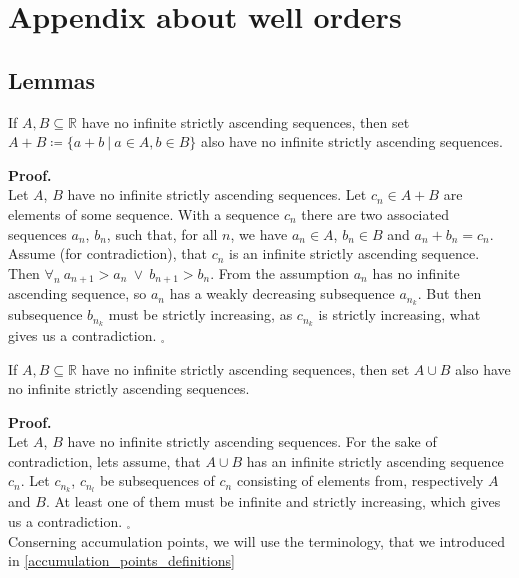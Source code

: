\chapter{Appendix about well orders}
\section{Lemmas}
\begin{lemma}\label{two_sets_lemma}
If $A, B \subseteq \mathbb{R}$ have no infinite strictly ascending sequences, then set 
$A + B \coloneqq \{a+b\ |\ a \in A, b \in B\}$ also have no infinite strictly ascending sequences. 
\end{lemma}
\noindent\textbf{Proof.} \\
Let $A$, $B$ have no infinite strictly ascending sequences. 
Let $c_n \in A + B$ are elements of some sequence. With a sequence $c_n$ there are 
two associated sequences $a_n$, $b_n$, such that, for all $n$, we have $a_n \in A$, 
$b_n \in B$ and 
$a_n + b_n = c_n$. Assume (for contradiction), that $c_n$ is an infinite strictly 
ascending sequence. 
Then $\forall_n\ a_{n+1}>a_n\ \lor\ b_{n+1} > b_n$. From the assumption $a_n$ has no infinite 
ascending sequence, so $a_n$ has a weakly decreasing subsequence $a_{n_k}$. But then 
subsequence $b_{n_k}$ must be strictly increasing, as $c_{n_k}$ is strictly increasing, what gives 
us a contradiction. 
$_\square$ 

\begin{lemma}\label{sum_lemma}
If $A, B \subseteq \mathbb{R}$ have no infinite strictly ascending sequences, then set 
$A \cup B$ also have no infinite strictly ascending sequences.
\end{lemma}
\textbf{Proof.} \\
Let $A$, $B$ have no infinite strictly ascending sequences. 
For the sake of contradiction, lets assume, that $A \cup B$ has an infinite strictly 
ascending sequence $c_n$. Let $c_{n_k}$, $c_{n_l}$ be subsequences of $c_n$ consisting 
of elements from, respectively $A$ and $B$. At least one of them must be infinite and 
strictly increasing, which gives us a contradiction. $_\square$ \\


Conserning accumulation points, we will use the terminology, that we introduced in 
\ref{accumulation_points_definitions}

